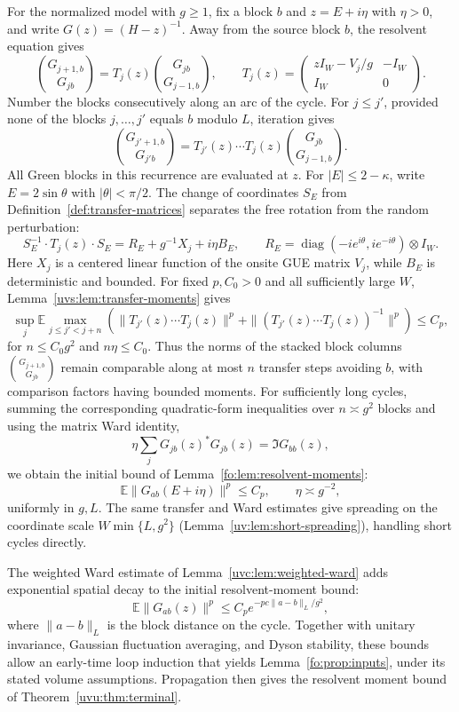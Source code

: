 \documentclass[11pt]{article}
\numberwithin{equation}{section}
\theoremstyle{remark}
\newcommand{\E}{\mathbb E}
\newcommand{\diag}{\operatorname{diag}}
\begin{document}
For the normalized model with $g\ge1$, fix a block $b$ and
$z=E+i\eta$ with $\eta>0$, and write $G(z)=(H-z)^{-1}$.
Away from the source block $b$, the resolvent equation gives
\[
 \binom{G_{j+1,b}}{G_{jb}}
 =T_j(z)\binom{G_{jb}}{G_{j-1,b}},\qquad
 T_j(z)=\begin{pmatrix}zI_W-V_j/g&-I_W\\I_W&0\end{pmatrix}.
\]
Number the blocks consecutively along an arc of the cycle. For $j\le j'$,
provided none of the blocks $j,\ldots,j'$ equals $b$ modulo $L$,
iteration gives
\begin{equation}\label{GGT}
\binom{G_{j'+1,b}}{G_{j'b}}
 =T_{j'}(z)\cdots T_j(z)\binom{G_{jb}}{G_{j-1,b}}.
\end{equation}
All Green blocks in this recurrence are evaluated at $z$.
For $|E|\le2-\kappa$, write $E=2\sin\theta$ with $|\theta|<\pi/2$. The change of
coordinates $S_E$ from Definition~\ref{def:transfer-matrices} separates
the free rotation from the random perturbation:
\[
 S_E^{-1}\cdot T_j(z)\cdot S_E
   =R_E+g^{-1}X_j+i\eta B_E,\qquad
 R_E=\diag(-ie^{i\theta},ie^{-i\theta})\otimes I_W.
\]
Here $X_j$ is a centered linear function of the onsite GUE matrix $V_j$,
while $B_E$ is deterministic and bounded. For fixed $p,C_0>0$ and
all sufficiently large $W$, Lemma~\ref{uvs:lem:transfer-moments} gives
\[
 \sup_j\E\max_{j\le j'<j+n}
 \left(\|T_{j'}(z)\cdots T_j(z)\|^p
       +\|(T_{j'}(z)\cdots T_j(z))^{-1}\|^p\right)\le C_p,
\]
for $n\le C_0g^2$ and $n\eta\le C_0$. Thus the norms of the stacked block
columns $\binom{G_{j+1,b}}{G_{jb}}$ remain comparable along at most
$n$ transfer steps avoiding $b$, with comparison
factors having bounded moments. For sufficiently long cycles,
summing the corresponding quadratic-form inequalities over $n\asymp g^2$
blocks and using the matrix Ward identity,
\[
 \eta\sum_j G_{jb}(z)^*G_{jb}(z)=\Im G_{bb}(z),
\]
we obtain the initial bound of Lemma~\ref{fo:lem:resolvent-moments}:
\[
 \E\|G_{ab}(E+i\eta)\|^p\le C_p,
 \qquad \eta\asymp g^{-2},
\]
uniformly in $g,L$.
The same transfer and Ward estimates give spreading on the coordinate
scale $W\min\{L,g^2\}$ (Lemma~\ref{uv:lem:short-spreading}), handling
short cycles directly.

The weighted Ward estimate of
Lemma~\ref{uvc:lem:weighted-ward} adds exponential spatial decay to the
initial resolvent-moment bound:
\[
 \E\|G_{ab}(z)\|^p\le C_p e^{-pc\|a-b\|_L/g^2},
\]
where $\|a-b\|_L$ is the block distance on the cycle.
Together with unitary invariance, Gaussian fluctuation averaging,
and Dyson stability, these bounds allow an early-time loop induction
that yields Lemma~\ref{fo:prop:inputs}, under its stated volume assumptions.
Propagation then gives the resolvent moment bound of
Theorem~\ref{uvu:thm:terminal}.
\end{document}
